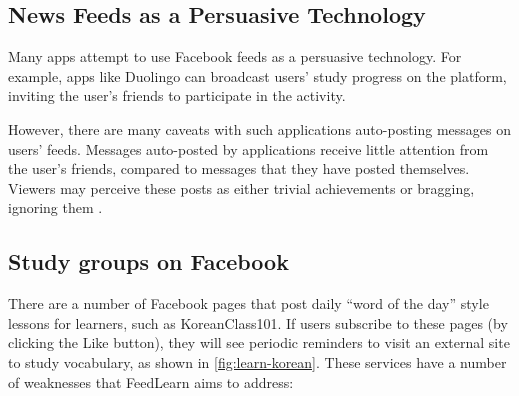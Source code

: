 \documentclass{chi-ext}
\begin{document}
\subsection{News Feeds as a Persuasive Technology}

Many apps attempt to use Facebook feeds as a persuasive technology. For example, apps like Duolingo can broadcast users' study progress on the platform, inviting the user's friends to participate in the activity. %

However, there are many caveats with such applications auto-posting messages on users' feeds. Messages auto-posted by applications receive little attention from the user's friends, compared to messages that they have posted themselves. Viewers may perceive these posts as either trivial achievements or bragging, ignoring them \cite{socialsharing}. %

\subsection{Study groups on Facebook}

There are a number of Facebook pages that post daily ``word of the day'' style lessons for learners, such as KoreanClass101. If users subscribe to these pages (by clicking the Like button), they will see periodic reminders to visit an external site to study vocabulary, as shown in \autoref{fig:learn-korean}. These services have a number of weaknesses that FeedLearn aims to address:
\end{document}
